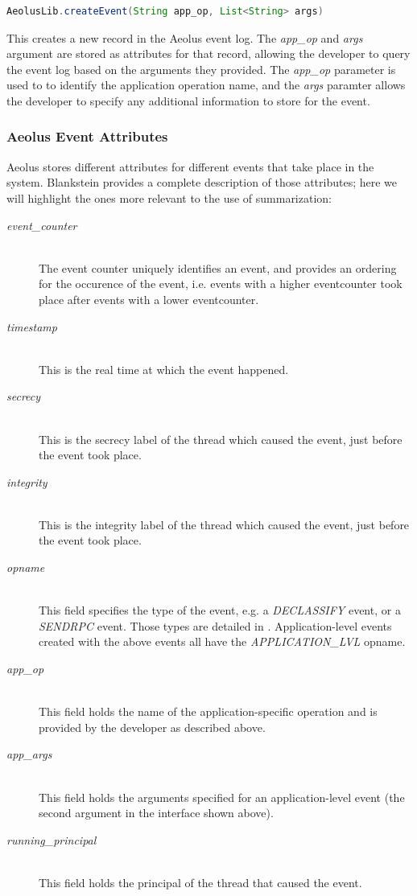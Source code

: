\begin{lstlisting}[language=Java, label=app-logging]
AeolusLib.createEvent(String app_op, List<String> args)
\end{lstlisting}

\noindent
This creates a new record in the Aeolus event log. The \emph{app\_op} and \emph{args} argument are stored as attributes for that record, allowing the developer to query the event log based on the arguments they provided. The \emph{app\_op} parameter is used to to identify the application operation name, and the \emph{args} paramter allows the developer to specify any additional information to store for the event.

\subsubsection{Aeolus Event Attributes}

Aeolus stores different attributes for different events that take place in the system. Blankstein \cite{blanks} provides a complete description of those attributes; here we will highlight the ones more relevant to the use of summarization:

\begin{description}
  \item[\emph{event\_counter}] \ \\
    The event counter uniquely identifies an event, and provides an
    ordering for the occurence of the event, i.e. events with a higher 
    eventcounter took place after events with a lower eventcounter.
  \item[\emph{timestamp}] \ \\
    This is the real time at which the event happened.
  \item[\emph{secrecy}] \ \\
    This is the secrecy label of the thread which caused the event, 
    just before the event took place.
  \item[\emph{integrity}] \ \\
    This is the integrity label of the thread which caused the event, 
    just before the event took place.
  \item[\emph{opname}] \ \\
    This field specifies the type of the event, 
    e.g. a \emph{DECLASSIFY} event, 
    or a \emph{SENDRPC} event. Those types are 
    detailed in \cite{blanks}.
    Application-level events created with the above events
    all have the \emph{APPLICATION\_LVL} opname.
  \item[\emph{app\_op}] \ \\
    This field holds the name of the 
    application-specific operation and is 
    provided by the developer as described above.
  \item[\emph{app\_args}] \ \\
    This field holds the arguments specified for an application-level 
    event (the second argument in the interface shown above).
  \item[\emph{running\_principal}] \ \\
    This field holds the principal of the thread that caused the event.
\end{description}

